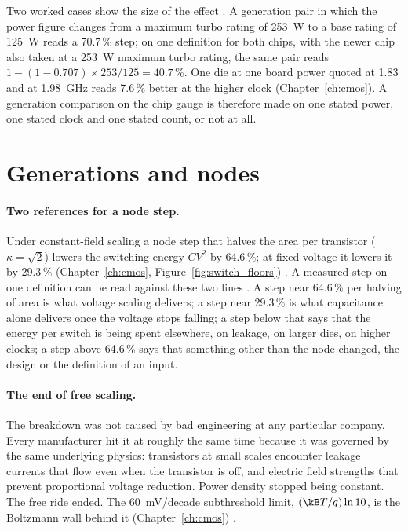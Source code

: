 Two worked cases show the size of the effect \calc. A generation pair in which the power figure changes from a maximum turbo rating of 253~W
to a base rating of 125~W reads a 70.7\,\% step; on one definition for both chips, with the newer chip also taken at a 253~W maximum turbo rating, the same pair reads $1-(1-0.707)\times253/125=40.7$\,\%.
One die at one board power quoted at 1.83 and at 1.98~GHz reads 7.6\,\% better at the higher clock (Chapter~\ref{ch:cmos}). A generation
comparison on the chip gauge is therefore made on one stated power, one stated clock and one stated count, or not at all.

\section{Generations and nodes}\label{sec:cg_nodes}
\paragraph{Two references for a node step.} Under constant-field scaling a node step that halves the area per transistor ($\kappa=\sqrt2$)
lowers the switching energy $CV^2$ by 64.6\,\%; at fixed voltage it lowers it by 29.3\,\% (Chapter~\ref{ch:cmos}, Figure~\ref{fig:switch_floors})
\derived. A measured step on one definition can be read against these two lines \interp. A step near 64.6\,\% per halving of area is what
voltage scaling delivers; a step near 29.3\,\% is what capacitance alone delivers once the voltage stops falling; a step below that says that
the energy per switch is being spent elsewhere, on leakage, on larger dies, on higher clocks; a step above 64.6\,\% says that something other
than the node changed, the design or the definition of an input.

\paragraph{The end of free scaling.} The breakdown was not caused by bad engineering at any particular company. Every manufacturer hit it at
roughly the same time because it was governed by the same underlying physics: transistors at small scales encounter leakage currents that
flow even when the transistor is off, and electric field strengths that prevent proportional voltage reduction. Power density stopped being
constant. The free ride ended. The 60~mV/decade subthreshold limit, $(\kB T/q)\ln10$, is the Boltzmann wall behind it (Chapter~\ref{ch:cmos})
\derived.

